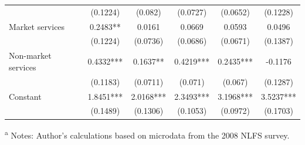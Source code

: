 \begin{table}[htbp]
{\begin{tabular}{lccccc}
& (0.1224) & (0.082) & (0.0727) & (0.0652) & (0.1228) \\
\hspace{1em}Market services & 0.2483** & 0.0161 & 0.0669 & 0.0593 & 0.0496 \\
& (0.1224) & (0.0736) & (0.0686) & (0.0671) & (0.1387) \\
\hspace{1em}Non-market services & 0.4332*** & 0.1637** & 0.4219*** & 0.2435*** & -0.1176 \\
& (0.1183) & (0.0711) & (0.071) & (0.067) & (0.1287) \\
Constant & 1.8451*** & 2.0168*** & 2.3493*** & 3.1968*** & 3.5237*** \\
& (0.1489) & (0.1306) & (0.1053) & (0.0972) & (0.1703) \\
\bottomrule
\end{tabular}}
\footnotesize{
\raggedleft
\textsuperscript{a} Notes: Author's calculations based on microdata from the 2008 NLFS survey. }
\end{table}


